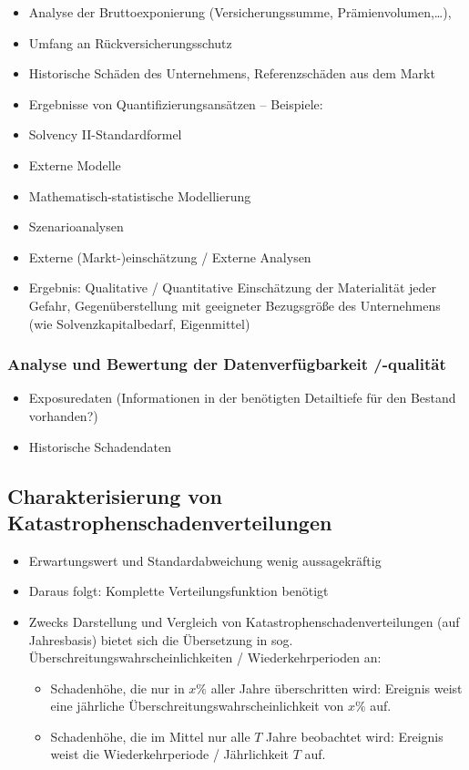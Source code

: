 \documentclass[12pt]{report}
\theoremstyle{dotless}
\theoremstyle{definition}
\begin{document}
\begin{itemize}
\item Analyse der Bruttoexponierung (Versicherungssumme, Prämienvolumen,…),
\item Umfang an Rückversicherungsschutz
\item Historische Schäden des Unternehmens, Referenzschäden aus dem Markt
\item Ergebnisse von Quantifizierungsansätzen – Beispiele:
\item Solvency II-Standardformel
\item Externe Modelle
\item Mathematisch-statistische Modellierung
\item Szenarioanalysen
\item Externe (Markt-)einschätzung / Externe Analysen
\item Ergebnis: Qualitative / Quantitative Einschätzung der Materialität jeder Gefahr, Gegenüberstellung mit geeigneter Bezugsgröße des Unternehmens (wie Solvenzkapitalbedarf, Eigenmittel)
\end{itemize}


\subsubsection{Analyse und Bewertung der Datenverfügbarkeit /-qualität}

\begin{itemize}
\item Exposuredaten (Informationen in der benötigten Detailtiefe für den Bestand vorhanden?)
\item Historische Schadendaten
\end{itemize}

\subsection{Charakterisierung von Katastrophenschadenverteilungen}

\begin{itemize}
\item Erwartungswert und Standardabweichung wenig aussagekräftig
\item Daraus folgt: Komplette Verteilungsfunktion benötigt
\item Zwecks Darstellung und Vergleich von Katastrophenschadenverteilungen (auf Jahresbasis) bietet sich die Übersetzung in sog. Überschreitungswahrscheinlichkeiten / Wiederkehrperioden an:
\begin{itemize}
\item Schadenhöhe, die nur in $x\%$ aller Jahre überschritten wird: Ereignis weist eine jährliche Überschreitungswahrscheinlichkeit von $x\%$ auf.
\item Schadenhöhe, die im Mittel nur alle $T$ Jahre beobachtet wird: Ereignis weist die Wiederkehrperiode / Jährlichkeit $T$ auf.
\end{itemize}
\end{itemize}
\end{document}
